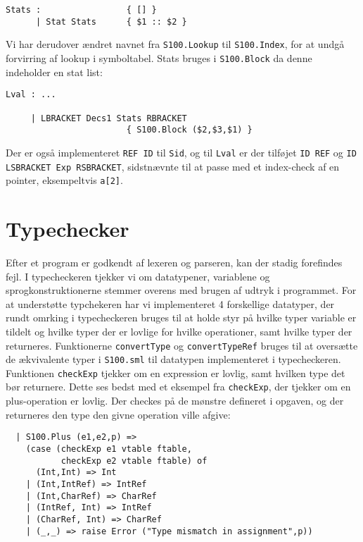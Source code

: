 \documentclass[12pt]{article}
\begin{document}
\begin{verbatim}
Stats :                 { [] }
      | Stat Stats      { $1 :: $2 }
\end{verbatim}

Vi har derudover ændret navnet fra \texttt{S100.Lookup} til \texttt{S100.Index},
for at undgå forvirring af lookup i symboltabel. Stats bruges i
    \texttt{S100.Block} da denne indeholder en stat list:\\

\begin{verbatim}
Lval : ...

     | LBRACKET Decs1 Stats RBRACKET
                        { S100.Block ($2,$3,$1) }
\end{verbatim}

Der er også implementeret \texttt{REF ID} til \texttt{Sid}, og til \texttt{Lval}
er der tilføjet \texttt{ID REF} og \texttt{ID LSBRACKET Exp RSBRACKET},
sidstnævnte til at passe med et index-check af en pointer, eksempeltvis
\texttt{a[2]}.

\section{Typechecker}
Efter et program er godkendt af lexeren og parseren, kan der stadig
forefindes fejl. I typecheckeren tjekker vi om datatypener, variablene og
sprogkonstruktionerne stemmer overens med brugen af udtryk i programmet. For at
understøtte typchekeren har vi implementeret 4 forskellige datatyper, der rundt
omrking i typecheckeren bruges til at holde styr på hvilke typer variable er
tildelt og hvilke typer der er lovlige for hvilke operationer, samt hvilke typer
der returneres. Funktionerne \texttt{convertType} og \texttt{convertTypeRef}
bruges til at oversætte de ækvivalente typer i \texttt{S100.sml} til datatypen
implementeret i typecheckeren. \\
Funktionen \texttt{checkExp} tjekker om en expression er lovlig, samt hvilken
type det bør returnere. Dette ses bedst med et eksempel fra \texttt{checkExp},
der tjekker om en plus-operation er lovlig. Der checkes på de mønstre defineret
i opgaven, og der returneres den type den givne operation ville afgive:\\

\begin{verbatim}
  | S100.Plus (e1,e2,p) =>
    (case (checkExp e1 vtable ftable,
           checkExp e2 vtable ftable) of
      (Int,Int) => Int
    | (Int,IntRef) => IntRef
    | (Int,CharRef) => CharRef
    | (IntRef, Int) => IntRef
    | (CharRef, Int) => CharRef
    | (_,_) => raise Error ("Type mismatch in assignment",p))
\end{verbatim}
\end{document}
